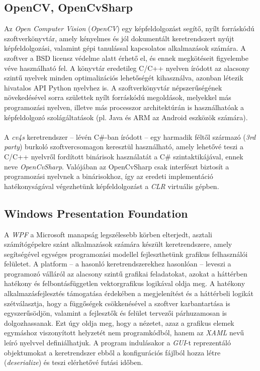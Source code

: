 \subsection{OpenCV, OpenCvSharp}

Az \emph{Open Computer Vision} (\emph{OpenCV}) egy képfeldolgozást segítő, nyílt forráskódú szoftverkönyvtár, amely kényelmes és jól dokumentált keretrendszert nyújt képfeldolgozási, valamint gépi tanulással kapcsolatos alkalmazások számára. A szoftver a BSD licensz védelme alatt érhető el, és ennek megkötéseit figyelembe véve használható fel. A könyvtár eredetileg C/C++ nyelven íródott az alacsony szintű nyelvek minden optimalizációs lehetőségét kihasználva, azonban létezik hivatalos API Python nyelvhez is. A szoftverkönyvtár népszerűségének növekedésével sorra születtek nyílt forráskódú megoldások, melyekkel más programozási nyelven, illetve más processzor architektúrán is használhatóak a képfeldolgozó szolágáltatások (pl. Java és ARM az Android eszközök számára).\\
\\
A \emph{cv4s} keretrendszer -- lévén C\#-ban íródott -- egy harmadik féltől származó (\textit{3rd party}) burkoló szoftvercsomagon keresztül használható, amely lehetővé teszi a C/C++ nyelvről fordított binárisok használatát a C\# szintaktikájával, ennek neve \emph{OpenCvSharp}. Valójában az OpenCvSharp csak interfészt biztosít a programozási nyelvnek a binárisokhoz, így az eredeti implementáció hatékonyságával végezhetünk képfeldolgozást a \emph{CLR} virtuális gépben.

\subsection{Windows Presentation Foundation}

A \emph{WPF} a Microsoft manapság legszélesebb körben elterjedt, asztali számítógépekre szánt alkalmazások számára készült keretrendszere, amely segítségével egységes programozási modellel fejleszthetünk grafikus felhasználói felületet. A platform -- a hasonló keretrendszerekhez hasonlóan -- leveszi a programozó válláról az alacsony szintű grafikai feladatokat, azokat a háttérben hatékony és felbontásfüggetlen vektorgrafikus logikával oldja meg. A hatékony alkalmazásfejlesztés támogatása érdekében a megjelenítést és a háttérbeli logikát szétválasztja, hogy a függőségek csökkenésével a szoftver karbantartása is egyszerűsödjön, valamint a fejlesztők és felület tervezői párhuzamosan is dolgozhassanak. Ezt úgy oldja meg, hogy a nézetet, azaz a grafikus elemek egymáshoz viszonyított helyzetét nem programkódból, hanem az \emph{XAML} nevű leíró nyelvvel definiálhatjuk. A program indulásakor a \emph{GUI}-t reprezentáló objektumokat a keretrendszer ebből a konfigurációs fájlból hozza létre (\emph{deserialize}) és teszi elérhetővé futási időben. 

